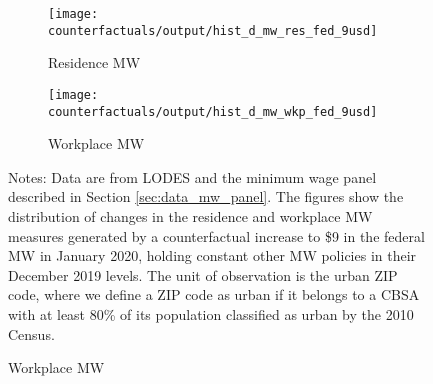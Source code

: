 \begin{figure}[h!]
    \centering
    \caption{Increases in minimum wage measures under a counterfactual increase 
             in the federal minimum wage to \$9, urban ZIP codes}
    \label{fig:cf_hist_res_and_wkp_mw}
    
    \begin{subfigure}{0.5\textwidth}
        \caption*{Residence MW}
        \texttt{[image: counterfactuals/output/hist\_d\_mw\_res\_fed\_9usd]}
    \end{subfigure}%
    \begin{subfigure}{0.5\textwidth}
        \caption*{Workplace MW}
        \texttt{[image: counterfactuals/output/hist\_d\_mw\_wkp\_fed\_9usd]}
    \end{subfigure}

    \begin{minipage}{.95\textwidth} \footnotesize
        \vspace{3mm}
        Notes:
        Data are from LODES and the minimum wage panel described in Section 
        \ref{sec:data_mw_panel}.
        The figures show the distribution of changes in the residence and 
        workplace MW measures generated by a counterfactual increase to \$9 
        in the federal MW in January 2020, holding constant other MW policies 
        in their December 2019 levels.
        The unit of observation is the urban ZIP code, where we define a ZIP code 
        as urban if it belongs to a CBSA with at least 80\% of its population 
        classified as urban by the 2010 Census.
    \end{minipage}
\end{figure}
